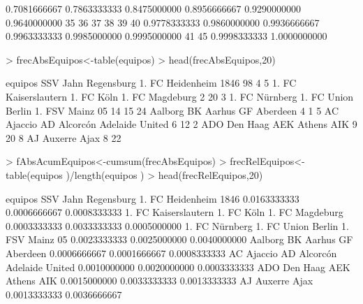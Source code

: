 \documentclass [a4paper] {article}
\begin{document}
\begin{Schunk}
\begin{Soutput}
0.7081666667 0.7863333333 0.8475000000 0.8956666667 0.9290000000 0.9640000000 
          35           36           37           38           39           40 
0.9778333333 0.9860000000 0.9936666667 0.9963333333 0.9985000000 0.9995000000 
          41           45 
0.9998333333 1.0000000000 
\end{Soutput}
\begin{Sinput}
> frecAbsEquipos<-table(equipos)
> head(frecAbsEquipos,20)
\end{Sinput}
\begin{Soutput}
equipos
                        SSV Jahn Regensburg 1. FC Heidenheim 1846 
                   98                     4                     5 
 1. FC Kaiserslautern            1. FC Köln       1. FC Magdeburg 
                    2                    20                     3 
       1. FC Nürnberg    1. FC Union Berlin       1. FSV Mainz 05 
                   14                    15                    24 
           Aalborg BK             Aarhus GF              Aberdeen 
                    4                     1                     5 
           AC Ajaccio           AD Alcorcón       Adelaide United 
                    6                    12                     2 
         ADO Den Haag            AEK Athens                   AIK 
                    9                    20                     8 
           AJ Auxerre                  Ajax 
                    8                    22 
\end{Soutput}
\begin{Sinput}
> fAbsAcumEquipos<-cumsum(frecAbsEquipos)
> frecRelEquipos<-table(equipos )/length(equipos )
> head(frecRelEquipos,20)
\end{Sinput}
\begin{Soutput}
equipos
                        SSV Jahn Regensburg 1. FC Heidenheim 1846 
         0.0163333333          0.0006666667          0.0008333333 
 1. FC Kaiserslautern            1. FC Köln       1. FC Magdeburg 
         0.0003333333          0.0033333333          0.0005000000 
       1. FC Nürnberg    1. FC Union Berlin       1. FSV Mainz 05 
         0.0023333333          0.0025000000          0.0040000000 
           Aalborg BK             Aarhus GF              Aberdeen 
         0.0006666667          0.0001666667          0.0008333333 
           AC Ajaccio           AD Alcorcón       Adelaide United 
         0.0010000000          0.0020000000          0.0003333333 
         ADO Den Haag            AEK Athens                   AIK 
         0.0015000000          0.0033333333          0.0013333333 
           AJ Auxerre                  Ajax 
         0.0013333333          0.0036666667 
\end{Soutput}
\end{Schunk}
\end{document}
